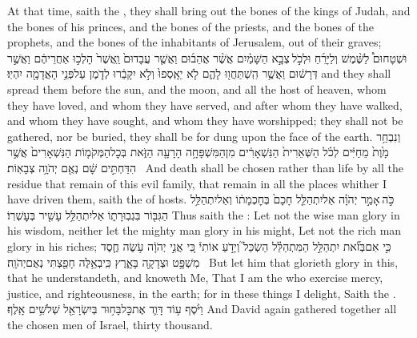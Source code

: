 {At that time, saith the \lord, they shall bring out the bones of the kings of Judah, and the bones of his princes, and the bones of the priests, and the bones of the prophets, and the bones of the inhabitants of Jerusalem, out of their graves;}
{וּשְׁטָחוּם֩ לַשֶּׁ֨מֶשׁ וְלַיָּרֵ֜חַ וּלְכֹ֣ל \legarmeh  צְבָ֣א הַשָּׁמַ֗יִם אֲשֶׁ֨ר אֲהֵב֜וּם וַאֲשֶׁ֤ר עֲבָדוּם֙ וַֽאֲשֶׁר֙ הָלְכ֣וּ אַחֲרֵיהֶ֔ם וַאֲשֶׁ֣ר דְּרָשׁ֔וּם וַאֲשֶׁ֥ר הִֽשְׁתַּחֲו֖וּ לָהֶ֑ם לֹ֤א יֵאָֽסְפוּ֙ וְלֹ֣א יִקָּבֵ֔רוּ לְדֹ֛מֶן עַל\maqqaf פְּנֵ֥י הָאֲדָמָ֖ה יִהְיֽוּ׃}
{and they shall spread them before the sun, and the moon, and all the host of heaven, whom they have loved, and whom they have served, and after whom they have walked, and whom they have sought, and whom they have worshipped; they shall not be gathered, nor be buried, they shall be for dung upon the face of the earth.}
{וְנִבְחַ֥ר מָ֙וֶת֙ מֵחַיִּ֔ים לְכֹ֗ל הַשְּׁאֵרִית֙ הַנִּשְׁאָרִ֔ים מִן\maqqaf הַמִּשְׁפָּחָ֥ה הָרָעָ֖ה הַזֹּ֑את בְּכׇל\maqqaf הַמְּקֹמ֤וֹת הַנִּשְׁאָרִים֙ אֲשֶׁ֣ר הִדַּחְתִּ֣ים שָׁ֔ם נְאֻ֖ם יְהֹוָ֥ה צְבָאֽוֹת׃ \setuma }
{And death shall be chosen rather than life by all the residue that remain of this evil family, that remain in all the places whither I have driven them, saith the \lord\space of hosts.}
\newperek
{}
\setcounter{chap}{9}
\setcounter{verse}{22}
{כֹּ֣ה \legarmeh  אָמַ֣ר יְהֹוָ֗ה אַל\maqqaf יִתְהַלֵּ֤ל חָכָם֙ בְּחׇכְמָת֔וֹ וְאַל\maqqaf יִתְהַלֵּ֥ל הַגִּבּ֖וֹר בִּגְבֽוּרָת֑וֹ אַל\maqqaf יִתְהַלֵּ֥ל עָשִׁ֖יר בְּעׇשְׁרֽוֹ׃}
{Thus saith the \lord: Let not the wise man glory in his wisdom, neither let the mighty man glory in his might, Let not the rich man glory in his riches;}
{כִּ֣י אִם\maqqaf בְּזֹ֞את יִתְהַלֵּ֣ל הַמִּתְהַלֵּ֗ל הַשְׂכֵּל֮ וְיָדֹ֣עַ אוֹתִי֒ כִּ֚י אֲנִ֣י יְהֹוָ֔ה עֹ֥שֶׂה חֶ֛סֶד מִשְׁפָּ֥ט וּצְדָקָ֖ה בָּאָ֑רֶץ כִּֽי\maqqaf בְאֵ֥לֶּה חָפַ֖צְתִּי נְאֻם\maqqaf יְהֹוָֽה׃ \setuma }
{But let him that glorieth glory in this, that he understandeth, and knoweth Me, That I am the \lord\space who exercise mercy, justice, and righteousness, in the earth; for in these things I delight, Saith the \lord.}
\label{haft_26}
\setcounter{chap}{6}
\setcounter{verse}{1}
{וַיֹּ֨סֶף ע֥וֹד דָּוִ֛ד אֶת\maqqaf כׇּל\maqqaf בָּח֥וּר בְּיִשְׂרָאֵ֖ל שְׁלֹשִׁ֥ים אָֽלֶף׃}
{And David again gathered together all the chosen men of Israel, thirty thousand.}
